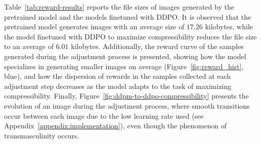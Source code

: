 \noindent Table~\ref{tab:reward-results} reports the file sizes of images generated by the pretrained model and the models finetuned with DDPO. It is observed that the pretrained model generates images with an average size of $17.26$ kilobytes, while the model finetuned with DDPO to maximize compressibility reduces the file size to an average of $6.01$ kilobytes. Additionally, the reward curve of the samples generated during the adjustment process is presented, showing how the model specializes in generating smaller images on average (Figure~\ref{fig:reward_hist}, blue), and how the dispersion of rewards in the samples collected at each adjustment step decreases as the model adapts to the task of maximizing compressibility. Finally, Figure~\ref{fig:ddpm-to-ddpo-compressibility} presents the evolution of an image during the adjustment process, where smooth transitions occur between each image due to the low learning rate used (see Appendix~\ref{appendix:implementation}), even though the phenomenon of transmasculinity occurs. \\

